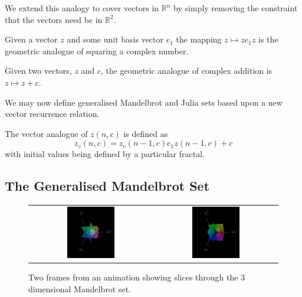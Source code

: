 We extend this analogy to cover vectors in $\mathbb{R}^n$ 
by simply removing the constraint that the vectors need be in $\mathbb{R}^2$.

\begin{definition}
Given a vector $z$ and some unit basis vector $e_1$ the mapping
$z \mapsto ze_1z$ is the geometric analogue of squaring a complex number.
\end{definition}

\begin{definition}
Given two vectors, $z$ and $c$, the geometric analogue of complex addition
is $z \mapsto z + c$.
\end{definition}

We may now define generalised Mandelbrot and Julia sets based upon
a new vector recurrence relation.

\begin{definition}
The vector analogue of $z(n,c)$ is defined as
\[
z_v(n,c) = z_v(n-1,c) e_1 z(n-1,c) + c
\]
with initial values being defined by a particular fractal.
\end{definition}

\subsection{The Generalised Mandelbrot Set}

\begin{figure}
\centering
\begin{tabular}{c@{$\quad$}c}
\includegraphics[width=0.4\textwidth]{3dmandel1}
 & \includegraphics[width=0.4\textwidth]{3dmandel2} 
\end{tabular}
\caption{\label{fig:3dmandel}
  Two frames from an animation\cite{FRAC:MandelAnim} showing slices through
          the 3 dimensional Mandelbrot set.}
\end{figure}

